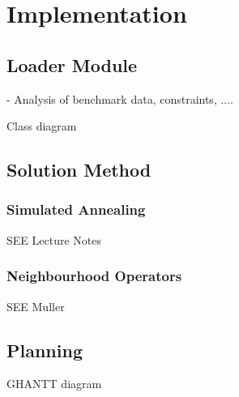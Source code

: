 \chapter{Implementation}
\label{implementation}
\thispagestyle{plain}




\section{Loader Module}

- Analysis of benchmark data, constraints, ....

Class diagram


\section{Solution Method}


\subsection{Simulated Annealing}

SEE Lecture Notes

\subsection{Neighbourhood Operators}

SEE Muller





\section{Planning}



GHANTT diagram





